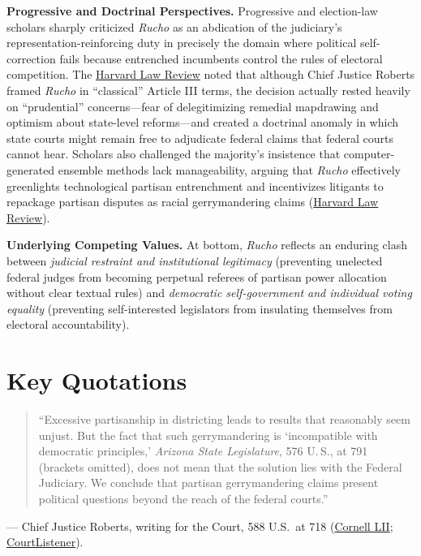 \documentclass[12pt]{article}
\begin{document}
\textbf{Progressive and Doctrinal Perspectives.} Progressive and election-law scholars sharply criticized \textit{Rucho} as an abdication of the judiciary's representation-reinforcing duty in precisely the domain where political self-correction fails because entrenched incumbents control the rules of electoral competition. The \href{https://harvardlawreview.org/print/vol-133/rucho-v-common-cause/}{Harvard Law Review} noted that although Chief Justice Roberts framed \textit{Rucho} in ``classical'' Article III terms, the decision actually rested heavily on ``prudential'' concerns---fear of delegitimizing remedial mapdrawing and optimism about state-level reforms---and created a doctrinal anomaly in which state courts might remain free to adjudicate federal claims that federal courts cannot hear. Scholars also challenged the majority's insistence that computer-generated ensemble methods lack manageability, arguing that \textit{Rucho} effectively greenlights technological partisan entrenchment and incentivizes litigants to repackage partisan disputes as racial gerrymandering claims (\href{https://harvardlawreview.org/print/vol-133/rucho-v-common-cause/}{Harvard Law Review}).

\textbf{Underlying Competing Values.} At bottom, \textit{Rucho} reflects an enduring clash between \textit{judicial restraint and institutional legitimacy} (preventing unelected federal judges from becoming perpetual referees of partisan power allocation without clear textual rules) and \textit{democratic self-government and individual voting equality} (preventing self-interested legislators from insulating themselves from electoral accountability).

\section{Key Quotations}

\begin{quote}
``Excessive partisanship in districting leads to results that reasonably seem unjust. But the fact that such gerrymandering is `incompatible with democratic principles,' \textit{Arizona State Legislature}, 576 U.\,S., at 791 (brackets omitted), does not mean that the solution lies with the Federal Judiciary. We conclude that partisan gerrymandering claims present political questions beyond the reach of the federal courts.''
\end{quote}
\noindent --- Chief Justice Roberts, writing for the Court, 588 U.S.\ at 718 (\href{https://www.law.cornell.edu/supremecourt/text/18-422}{Cornell LII}; \href{https://www.courtlistener.com/opinion/4633469/rucho-v-common-cause/}{CourtListener}).
\end{document}
